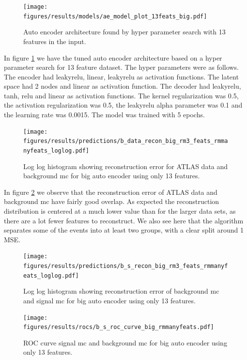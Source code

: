 \documentclass[ reprint, amsmath,amssymb, aps, nofootinbib]{revtex4-2}
\begin{document}
\begin{figure}[H]    
  \centering
         \texttt{[image: figures/results/models/ae\_model\_plot\_13feats\_big.pdf]}
         \caption{Auto encoder architecture found by hyper parameter search with 13 features in the input.}
         \label{fig:ae_13feats_big}  
  
\end{figure}

In figure \ref{fig:ae_13feats_big} we have the tuned auto encoder architecture based on a hyper parameter search for 13 feature dataset. The hyper parameters were as follows. The encoder had leakyrelu, linear, leakyrelu as activation functions. The latent space had 2 nodes and linear as activation function. The decoder had leakyrelu, tanh, relu and linear as activation functions. The kernel regularization was 0.5, the activation regularization was 0.5, the leakyrelu alpha parameter was 0.1 and the learning rate was 0.0015. The model was trained with 5 epochs.

\begin{figure}[H]
     \centering
         \texttt{[image: figures/results/predictions/b\_data\_recon\_big\_rm3\_feats\_rmmanyfeats\_loglog.pdf]}
         \caption{Log log histogram showing reconstruction error for ATLAS data and background mc for big auto encoder using only 13 features.}
     \label{fig:data_b_big_pred_13feats}
\end{figure}

In figure \ref{fig:data_b_big_pred_13feats} we observe that the reconstruction error of ATLAS data and background mc have fairly good overlap. As expected the reconstruction distribution is centered at a much lower value than for the larger data sets, as there are a lot fewer features to reconstruct. We also see here that the algorithm separates some of the events into at least two groups, with a clear split around 1 MSE. 

\begin{figure}[H]
    \centering
    \texttt{[image: figures/results/predictions/b\_s\_recon\_big\_rm3\_feats\_rmmanyfeats\_loglog.pdf]}
    \caption{Log log histogram showing reconstruction error of background mc and signal mc for big auto encoder using only 13 features. }
    \label{fig:roc_sig_big_13feats}
\end{figure}

\begin{figure}[H]
    \centering
         \texttt{[image: figures/results/rocs/b\_s\_roc\_curve\_big\_rmmanyfeats.pdf]}
         \caption{ROC curve signal mc and background mc for big auto encoder using only 13 features.}
         \label{fig:s_b_big_roc_13}
\end{figure}
\end{document}
